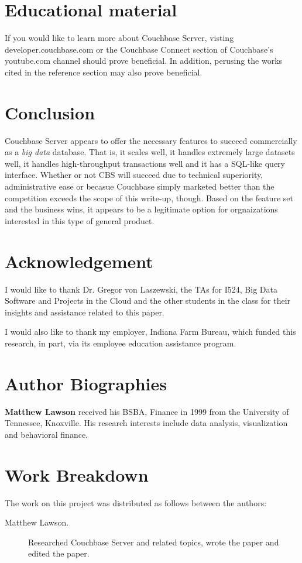 \documentclass[9pt,twocolumn,twoside]{styles/osajnl}
\newcommand{\TODO}[2][]{\todo[color=red!10,inline,#1]{#2}}
\newcommand{\SE}{\TODO{Spelling}}
\begin{document}
\section{Educational material}

If you would like to learn more about Couchbase Server, visting developer.couchbase.com or the Couchbase Connect section of Couchbase's youtube.com channel should prove beneficial.  In addition, perusing the works cited in the reference section may also prove beneficial.

\section{Conclusion}

Couchbase Server appears to offer the necessary features to succeed commercially as a \textit{big data} database.  That is, it scales well, it handles extremely large datasets well, it handles high-throughput transactions well and it has a SQL-like query interface.  Whether or not CBS will succeed due to technical superiority, administrative ease or becasue \SE Couchbase simply marketed better than the competition exceeds the scope of this write-up, though.  Based on the feature set and the business wins, it appears to be a legitimate option for orgnaizations \SE interested in this type of general product.

\section{Acknowledgement}

I would like to thank Dr. Gregor von Laszewski, the TAs for I524, Big Data Software and Projects in the Cloud and the other students in the class for their insights and assistance related to this paper.

I would also like to thank my employer, Indiana Farm Bureau, which funded this research, in part, via its employee education assistance program.




\section*{Author Biographies}
\begingroup
\setlength\intextsep{0pt}
\begin{minipage}[t][3.2cm][t]{1.0\columnwidth} %
  \noindent
  {\bfseries Matthew Lawson} received his BSBA, Finance in 1999 from
  the University of Tennessee, Knoxville. His research interests include
  data analysis, visualization and behavioral finance.
\end{minipage}
\endgroup


\appendix

\section{Work Breakdown}

The work on this project was distributed as follows between the
authors:

\begin{description}
\item[Matthew Lawson.] Researched Couchbase Server and related topics, wrote the paper and edited the paper.
\end{description}
\end{document}
